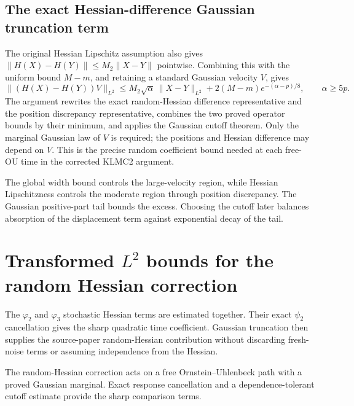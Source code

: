 \documentclass[11pt,a4paper]{report}
\begin{document}
\subsection{\texorpdfstring{The exact Hessian-difference Gaussian truncation term}{The exact Hessian-difference Gaussian truncation term}}
\label{report-step-KineticLangevin-HessianDifference-lean-4}


The original Hessian Lipschitz assumption also gives \(\|H(X)-H(Y)\|\le M_2\|X-Y\|\) pointwise. Combining this with the uniform bound \(M-m\), and retaining a standard Gaussian velocity \(V\), gives \[\|(H(X)-H(Y))V\|_{L^2}\le M_2\sqrt\alpha\,\|X-Y\|_{L^2}+2(M-m)e^{-(\alpha-p)/8},\qquad\alpha\ge5p.\] The argument rewrites the exact random-Hessian difference representative and the position discrepancy representative, combines the two proved operator bounds by their minimum, and applies the Gaussian cutoff theorem. Only the marginal Gaussian law of \(V\) is required; the positions and Hessian difference may depend on \(V\). This is the precise random coefficient bound needed at each free-OU time in the corrected KLMC2 argument.



The global width bound controls the large-velocity region, while Hessian Lipschitzness controls the moderate region through position discrepancy. The Gaussian positive-part tail bounds the excess. Choosing the cutoff later balances absorption of the displacement term against exponential decay of the tail.

\section{\texorpdfstring{Transformed \(L^{2}\) bounds for the random Hessian correction}{Transformed L² bounds for the random Hessian correction}}
\label{proof-module-KineticLangevin-FreeOUCorrectionBound-lean}


The \(\varphi _{2}\) and \(\varphi _{3}\) stochastic Hessian terms are estimated together. Their exact \(\psi _{2}\) cancellation gives the sharp quadratic time coefficient. Gaussian truncation then supplies the source-paper random-Hessian contribution without discarding fresh-noise terms or assuming independence from the Hessian.



The random-Hessian correction acts on a free Ornstein–Uhlenbeck path with a proved Gaussian marginal. Exact response cancellation and a dependence-tolerant cutoff estimate provide the sharp comparison terms.
\end{document}
